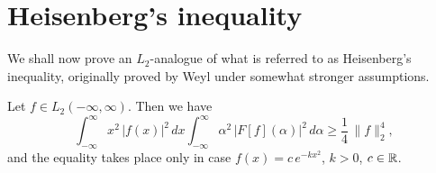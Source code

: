 \setcounter{section}{4}
\section{Heisenberg's inequality}
\label{sec:II-5}

We shall now prove an $L_{2}$-analogue of what is referred to as Heisenberg's inequality, originally proved by Weyl under somewhat stronger assumptions.

\begin{theorem}\label{thm:II-8}
Let $f\in L_{2}(-\infty,\infty)$. Then we have
\begin{equation}\tag{5.1}\label{eq:II-5.1}
\int_{-\infty}^{\infty}x^{2}\,|f(x)|^{2}\,dx
\int_{-\infty}^{\infty}\alpha^{2}\,|F[f](\alpha)|^{2}\,d\alpha
\ge \frac{1}{4}\,\|f\|_{2}^{4},
\end{equation}
and the equality takes place only in case $f(x)=c\,e^{-kx^{2}}$, $k>0$, $c\in\mathbb{R}$.
\end{theorem}
